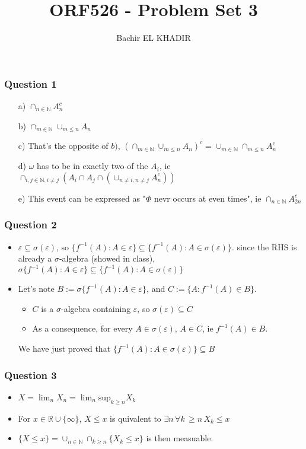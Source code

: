\documentclass[12pt]{article}
\title{ORF526 - Problem Set 3}
\author{Bachir EL KHADIR }
\newcommand{\Q}[1]{\subsubsection*{Question #1}}
\newcommand{\salgebra}{$\sigma$-algebra }
\begin{document}
\maketitle

\Q{1}

\begin{itemize}
\item [a)] $\cap_{n \in \mathbb{N}} A_n^c$
\item [b)] $\cap_{m \in \mathbb{N}} \cup_{m \leq n} A_n$
\item [c)] That's the opposite of $b)$, $\left(\cap_{m \in \mathbb{N}} \cup_{m \leq n} A_n \right)^c = \cup_{m \in \mathbb{N}} \cap_{m \leq n} A_n^c $
\item [d)] $\omega$ has to be in exactly two of the $A_i$, ie $\cap_{ i,j \in \mathbb{N}, i \neq j} \left(A_i \cap A_j \cap (\cup_{n \neq i, n \neq j} A_n^c) \right)$
\item [e)] This event can be expressed as "$\Phi$ nevr occurs at even times", ie $\cap_{n \in \mathbb{N}} A_{2 n}^c$
\end{itemize}

\Q{2}
\begin{itemize}
\item $\varepsilon \subseteq \sigma(\varepsilon)$, so $\{ f^{-1}(A) : A \in \varepsilon \} \subseteq \{ f^{-1}(A) : A \in \sigma(\varepsilon) \}$. since the RHS is already a $\sigma$-algebra (showed in class), $\sigma \{ f^{-1}(A) : A \in \varepsilon \} \subseteq \{ f^{-1}(A) : A \in \sigma(\varepsilon) \}$
\item Let's note $B := \sigma \{ f^{-1}(A) : A \in \varepsilon \}$, and $C := \{ A: f^{-1}(A) \in B \}$.
\begin{itemize}
\item $C$ is a \salgebra containing $\varepsilon$, so $\sigma(\varepsilon) \subseteq C$
\item As a consequence, for every $A \in \sigma(\varepsilon)$, $A \in C$, ie $f^{-1}(A) \in B$.
\end{itemize}
We have just proved that $\{ f^{-1}(A) : A \in \sigma(\varepsilon) \}  \subseteq B$
\end{itemize}


\Q{3} 
\begin{itemize}
\item $X = \lim_n X_n = \lim_n \text{sup}_{k \geq n} X_k$
\item For $x \in  \mathbb{R} \cup \{ \infty \}$, $X \leq x$ is quivalent to $\exists n \, \forall k \, \geq n \, X_k \leq x$
\item $\{X \leq x\} = \cup_{n \in \mathbb{N}} \cap_{k \geq n} \{X_k \leq x \}$ is then measuable.
\end{itemize}
\end{document}
